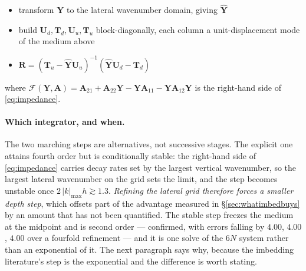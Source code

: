 \documentclass[11pt,a4paper]{article}
\newcommand{\bA}{\mathbf{A}}
\newcommand{\bR}{\mathbf{R}}
\newcommand{\bY}{\mathbf{Y}}
\begin{document}
\begin{minipage}{\linewidth}
\begin{itemize}
\begin{itemize}
\item (*{\em the reflection matrix at the top\/}*)
\end{itemize}

\item transform $\bY$ to the lateral wavenumber domain, giving $\hat{\bY}$
\item build $\mathbf{U}_d,\mathbf{T}_d,\mathbf{U}_u,\mathbf{T}_u$
      block-diagonally, each column a unit-displacement mode of the medium
      above
\item $\bR = \left(\mathbf{T}_u-\hat{\bY}\mathbf{U}_u\right)^{-1}
             \left(\hat{\bY}\mathbf{U}_d-\mathbf{T}_d\right)$
\end{itemize}
\end{minipage}

\vspace{3mm}
\noindent where
$\mathcal{F}(\bY,\bA)=\bA_{21}+\bA_{22}\bY-\bY\bA_{11}-\bY\bA_{12}\bY$ is the
right-hand side of \eqref{eq:impedance}.

\paragraph{Which integrator, and when.}  The two marching steps are
alternatives, not successive stages.  The explicit one attains fourth order but
is conditionally stable: the right-hand side of \eqref{eq:impedance} carries
decay rates set by the largest vertical wavenumber, so the largest lateral
wavenumber on the grid sets the limit, and the step becomes unstable once
$2\,|k|_{\max}h \gtrsim 1.3$.  \emph{Refining the lateral grid therefore
forces a smaller depth step}, which offsets part of the advantage measured in
\S\ref{sec:whatimbedbuys} by an amount that has not been quantified.  The
stable step freezes the medium at the midpoint and is second order --- confirmed,
with errors falling by $4.00$, $4.00$, $4.00$ over a fourfold refinement --- and
it is one solve of the $6N$ system rather than an exponential of it.  The next
paragraph says why, because the imbedding literature's step is the exponential
and the difference is worth stating.
\end{document}
